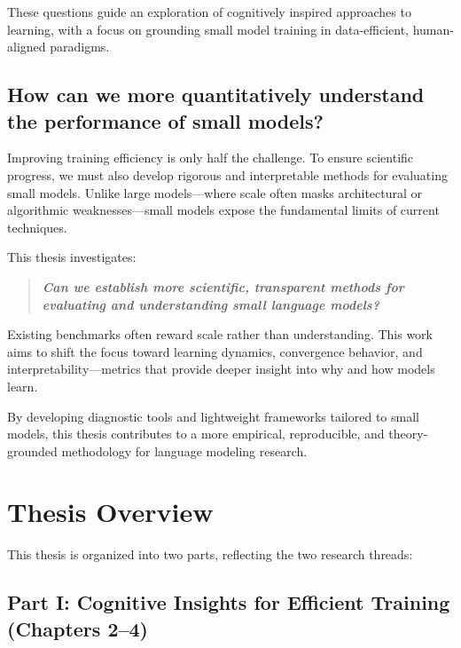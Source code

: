 These questions guide an exploration of cognitively inspired approaches to learning, with a focus on grounding small model training in data-efficient, human-aligned paradigms.

\subsection{How can we more quantitatively understand the performance of small models?}

Improving training efficiency is only half the challenge. To ensure scientific progress, we must also develop rigorous and interpretable methods for evaluating small models. Unlike large models—where scale often masks architectural or algorithmic weaknesses—small models expose the fundamental limits of current techniques.

This thesis investigates:

\begin{quote}
    \textbf{\emph{Can we establish more scientific, transparent methods for evaluating and understanding small language models?}}
\end{quote}

Existing benchmarks often reward scale rather than understanding. This work aims to shift the focus toward learning dynamics, convergence behavior, and interpretability—metrics that provide deeper insight into why and how models learn.

By developing diagnostic tools and lightweight frameworks tailored to small models, this thesis contributes to a more empirical, reproducible, and theory-grounded methodology for language modeling research.

\section*{Thesis Overview}

This thesis is organized into two parts, reflecting the two research threads:

\subsection*{Part I: Cognitive Insights for Efficient Training (Chapters 2–4)}

